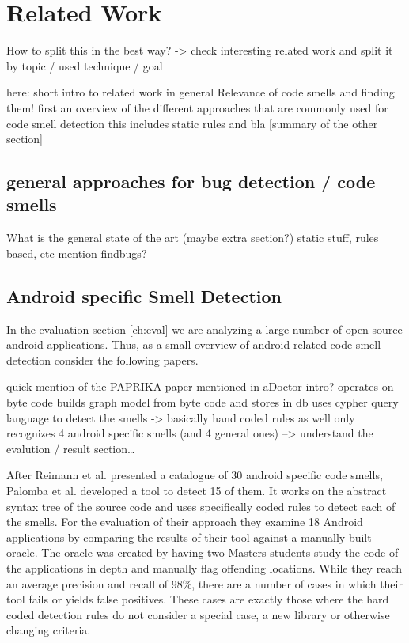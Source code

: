 \chapter{Related Work}

How to split this in the best way?
-> check interesting related work and split it by topic / used technique / goal


here: short intro to related work in general
Relevance of code smells and finding them!
first an overview of the different approaches that are commonly used for code smell detection
this includes static rules and bla
[summary of the other section]

\section{general approaches for bug detection / code smells}
What is the general state of the art (maybe extra section?)
static stuff, rules based, etc
mention findbugs?

\section{Android specific Smell Detection}

In the evaluation section \ref{ch:eval} we are analyzing a large number of open source android applications.
Thus, as a small overview of android related code smell detection consider the following papers.

quick mention of the PAPRIKA paper mentioned in aDoctor intro?
    operates on byte code
    builds graph model from byte code and stores in db
    uses cypher query language to detect the smells -> basically hand coded rules as well
    only recognizes 4 android specific smells (and 4 general ones)
    --> understand the evalution / result section\ldots

After Reimann et al. \cite{reimann2014tool} presented a catalogue of 30 android specific code smells, Palomba et al. \cite{palomba2017lightweight} developed a tool to detect 15 of them.
It works on the abstract syntax tree of the source code and uses specifically coded rules to detect each of the smells.
For the evaluation of their approach they examine 18 Android applications by comparing the results of their tool against a manually built oracle.
The oracle was created by having two Masters students study the code of the applications in depth and manually flag offending locations.
While they reach an average precision and recall of 98\%, there are a number of cases in which their tool fails or yields false positives.
These cases are exactly those where the hard coded detection rules do not consider a special case, a new library or otherwise changing criteria.

